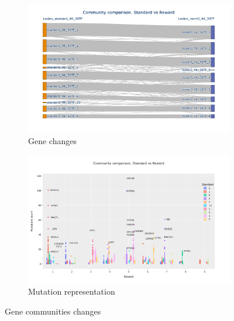 \begin{figure}[H]
    \centering
    \begin{subfigure}[!t]{1.0\textwidth}
        \includegraphics[width=\textwidth,keepaspectratio]{Sections/Network_I/Resources/P0/Comms/Sky_Comm_Comp_4K_v3.png}
        \caption{Gene changes}
        \label{fig:N_I:p0_chg_sankey}
    \end{subfigure}
    \begin{subfigure}[!t]{1.0\textwidth}
        \includegraphics[width=\textwidth,keepaspectratio]{Sections/Network_I/Resources/P0/Comms/Mut_Comm_Comp_4K_v3.png}
        \caption{Mutation representation}
        \label{fig:N_I:p0_chg_mut}
    \end{subfigure}
    \caption{Gene communities changes}
    \label{fig:N_I:p0_comm_chgs_1}
\end{figure}
